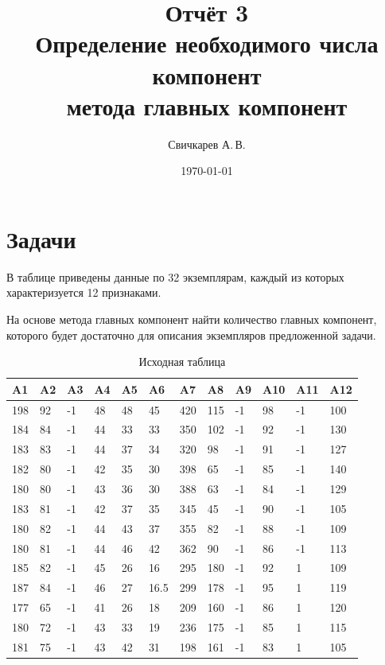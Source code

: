\documentclass{article} %
\title{Отчёт 3\\
Определение необходимого числа компонент\\
метода главных компонент} %
\author{Свичкарев А.\,В.} %
\date{\today} %
\begin{document}

\maketitle %

\section*{Задачи}
В таблице приведены данные по 32 экземплярам,
каждый из которых характеризуется 12 признаками.

На основе метода главных компонент найти количество главных компонент,
которого будет достаточно для описания экземпляров предложенной задачи.

\begin{table}[H]
\centering
\caption{Исходная таблица}
\begin{tabular}{|l|l|l|l|l|l|l|l|l|l|l|l|}
\hline
A1  & A2 & A3 & A4 & A5 & A6   & A7  & A8  & A9 & A10 & A11 & A12 \\ \hline
198 & 92 & -1 & 48 & 48 & 45   & 420 & 115 & -1 & 98  & -1  & 100 \\ \hline
184 & 84 & -1 & 44 & 33 & 33   & 350 & 102 & -1 & 92  & -1  & 130 \\ \hline
183 & 83 & -1 & 44 & 37 & 34   & 320 & 98  & -1 & 91  & -1  & 127 \\ \hline
182 & 80 & -1 & 42 & 35 & 30   & 398 & 65  & -1 & 85  & -1  & 140 \\ \hline
180 & 80 & -1 & 43 & 36 & 30   & 388 & 63  & -1 & 84  & -1  & 129 \\ \hline
183 & 81 & -1 & 42 & 37 & 35   & 345 & 45  & -1 & 90  & -1  & 105 \\ \hline
180 & 82 & -1 & 44 & 43 & 37   & 355 & 82  & -1 & 88  & -1  & 109 \\ \hline
180 & 81 & -1 & 44 & 46 & 42   & 362 & 90  & -1 & 86  & -1  & 113 \\ \hline
185 & 82 & -1 & 45 & 26 & 16   & 295 & 180 & -1 & 92  & 1   & 109 \\ \hline
187 & 84 & -1 & 46 & 27 & 16.5 & 299 & 178 & -1 & 95  & 1   & 119 \\ \hline
177 & 65 & -1 & 41 & 26 & 18   & 209 & 160 & -1 & 86  & 1   & 120 \\ \hline
180 & 72 & -1 & 43 & 33 & 19   & 236 & 175 & -1 & 85  & 1   & 115 \\ \hline
181 & 75 & -1 & 43 & 42 & 31   & 198 & 161 & -1 & 83  & 1   & 105 \\ \hline

\end{tabular}
\end{table}
\end{document}

